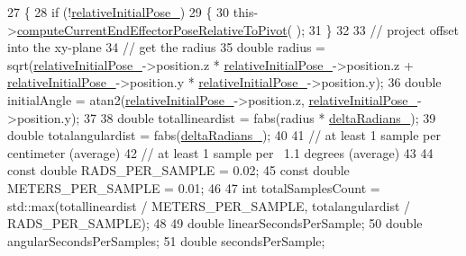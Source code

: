 \begin{DoxyCode}
27     \{
28         \textcolor{keywordflow}{if} (!\hyperlink{classcl__move__group__interface_1_1CbCircularPivotMotion_a1b2cc65d2f27a4dec54c20f1f00d4bb8}{relativeInitialPose\_})
29         \{
30             this->\hyperlink{classcl__move__group__interface_1_1CbCircularPivotMotion_a147d7113ed686709dc2d362e56a95ad9}{computeCurrentEndEffectorPoseRelativeToPivot}(
      );
31         \}
32 
33         \textcolor{comment}{// project offset into the xy-plane}
34         \textcolor{comment}{// get the radius}
35         \textcolor{keywordtype}{double} radius = sqrt(\hyperlink{classcl__move__group__interface_1_1CbCircularPivotMotion_a1b2cc65d2f27a4dec54c20f1f00d4bb8}{relativeInitialPose\_}->position.z * 
      \hyperlink{classcl__move__group__interface_1_1CbCircularPivotMotion_a1b2cc65d2f27a4dec54c20f1f00d4bb8}{relativeInitialPose\_}->position.z + \hyperlink{classcl__move__group__interface_1_1CbCircularPivotMotion_a1b2cc65d2f27a4dec54c20f1f00d4bb8}{relativeInitialPose\_}->position.y
       * \hyperlink{classcl__move__group__interface_1_1CbCircularPivotMotion_a1b2cc65d2f27a4dec54c20f1f00d4bb8}{relativeInitialPose\_}->position.y);
36         \textcolor{keywordtype}{double} initialAngle = atan2(\hyperlink{classcl__move__group__interface_1_1CbCircularPivotMotion_a1b2cc65d2f27a4dec54c20f1f00d4bb8}{relativeInitialPose\_}->position.z, 
      \hyperlink{classcl__move__group__interface_1_1CbCircularPivotMotion_a1b2cc65d2f27a4dec54c20f1f00d4bb8}{relativeInitialPose\_}->position.y);
37 
38         \textcolor{keywordtype}{double} totallineardist = fabs(radius * \hyperlink{classcl__move__group__interface_1_1CbCircularPivotMotion_afade33f1182615c64ea972075bfd2b95}{deltaRadians\_});
39         \textcolor{keywordtype}{double} totalangulardist = fabs(\hyperlink{classcl__move__group__interface_1_1CbCircularPivotMotion_afade33f1182615c64ea972075bfd2b95}{deltaRadians\_});
40 
41         \textcolor{comment}{// at least 1 sample per centimeter (average)}
42         \textcolor{comment}{// at least 1 sample per ~1.1 degrees (average)}
43 
44         \textcolor{keyword}{const} \textcolor{keywordtype}{double} RADS\_PER\_SAMPLE = 0.02;
45         \textcolor{keyword}{const} \textcolor{keywordtype}{double} METERS\_PER\_SAMPLE = 0.01;
46 
47         \textcolor{keywordtype}{int} totalSamplesCount = std::max(totallineardist / METERS\_PER\_SAMPLE, totalangulardist / 
      RADS\_PER\_SAMPLE);
48 
49         \textcolor{keywordtype}{double} linearSecondsPerSample;
50         \textcolor{keywordtype}{double} angularSecondsPerSamples;
51         \textcolor{keywordtype}{double} secondsPerSample;

\end{DoxyCode}

